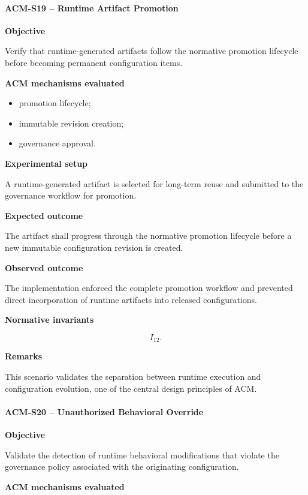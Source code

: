 \documentclass[10pt]{article}
\begin{document}
\paragraph{ACM-S19 -- Runtime Artifact Promotion}

\textbf{Objective}

Verify that runtime-generated artifacts follow the normative promotion
lifecycle before becoming permanent configuration items.

\textbf{ACM mechanisms evaluated}

\begin{itemize}
    \item promotion lifecycle;
    \item immutable revision creation;
    \item governance approval.
\end{itemize}

\textbf{Experimental setup}

A runtime-generated artifact is selected for long-term reuse and submitted to
the governance workflow for promotion.

\textbf{Expected outcome}

The artifact shall progress through the normative promotion lifecycle before a
new immutable configuration revision is created.

\textbf{Observed outcome}

The implementation enforced the complete promotion workflow and prevented
direct incorporation of runtime artifacts into released configurations.

\textbf{Normative invariants}

\[
I_{12}.
\]

\textbf{Remarks}

This scenario validates the separation between runtime execution and
configuration evolution, one of the central design principles of ACM.

\paragraph{ACM-S20 -- Unauthorized Behavioral Override}

\textbf{Objective}

Validate the detection of runtime behavioral modifications that violate the
governance policy associated with the originating configuration.

\textbf{ACM mechanisms evaluated}
\end{document}
